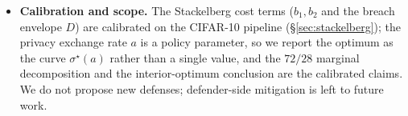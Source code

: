 \documentclass[final,1p,times]{elsarticle}
\begin{document}
\begin{itemize}
  boundary, while FLAME (cosine statistics) leaves the attack nearly
  unfiltered---a scope statement, not a rebuttal. Probing is modeled
  as a one-shot offline read; the Supplementary Material shows an online reactive
attacker gains nothing (signed gain $-0.003$ to $-0.020$). Full online
re-estimation of $\{\eta_{\max,i}\}$ remains open. All results concern the per-update DP noise model
  (\S\ref{sec:setting}).
  \item \textbf{Calibration and scope.} The Stackelberg cost terms
  ($b_1,b_2$ and the breach envelope $D$) are calibrated on the
  CIFAR-10 pipeline (\S\ref{sec:stackelberg}); the privacy exchange
  rate $a$ is a policy parameter, so we report the optimum as the
  curve $\sigma^\star(a)$ rather than a single value, and the
  $72/28$ marginal decomposition and the interior-optimum conclusion
  are the calibrated claims. We do not propose new defenses;
  defender-side mitigation is left to future work.
\end{itemize}

\end{document}
